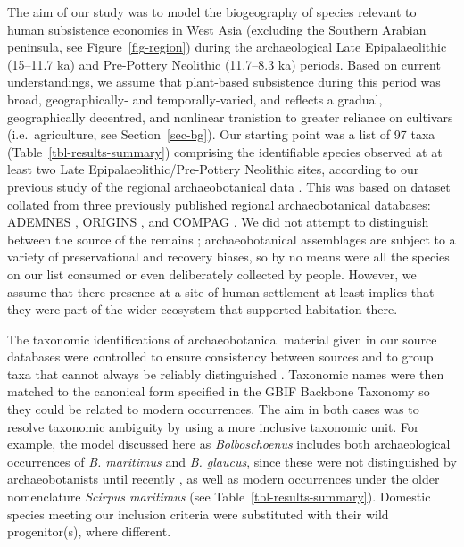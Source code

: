 \documentclass[
  authoryear,
  preprint]{elsarticle}
\begin{document}
The aim of our study was to model the biogeography of species relevant
to human subsistence economies in West Asia (excluding the Southern
Arabian peninsula, see Figure~\ref{fig-region}) during the
archaeological Late Epipalaeolithic (15--11.7 ka) and Pre-Pottery
Neolithic (11.7--8.3 ka) periods. Based on current understandings, we
assume that plant-based subsistence during this period was broad,
geographically- and temporally-varied, and reflects a gradual,
geographically decentred, and nonlinear tranistion to greater reliance
on cultivars (i.e.~agriculture, see Section~\ref{sec-bg}). Our starting
point was a list of 97 taxa (Table~\ref{tbl-results-summary}) comprising
the identifiable species observed at at least two Late
Epipalaeolithic/Pre-Pottery Neolithic sites, according to our previous
study of the regional archaeobotanical data
\citep{ArranzOtaeguiRoe2023}. This was based on dataset collated from
three previously published regional archaeobotanical databases: ADEMNES
\citep{ADEMNES}, ORIGINS \citep{ORIGINS}, and COMPAG
\citetext{\citealp{LucasFuller2018}; \citealp{FullerEtAl2018}; \citealp[based
on][]{ColledgeEtAl2004}; \citealp{ShennanConolly2007}}. We did not
attempt to distinguish between the source of the remains
\citep[cf.][]{WallaceEtAl2018}; archaeobotanical assemblages are subject
to a variety of preservational and recovery biases, so by no means were
all the species on our list consumed or even deliberately collected by
people. However, we assume that there presence at a site of human
settlement at least implies that they were part of the wider ecosystem
that supported habitation there.

The taxonomic identifications of archaeobotanical material given in our
source databases were controlled to ensure consistency between sources
and to group taxa that cannot always be reliably distinguished
\citep[for details see][]{ArranzOtaeguiRoe2023}. Taxonomic names were
then matched to the canonical form specified in the GBIF Backbone
Taxonomy \citep{GBIFSecretariat2023} so they could be related to modern
occurrences. The aim in both cases was to resolve taxonomic ambiguity by
using a more inclusive taxonomic unit. For example, the model discussed
here as \emph{Bolboschoenus} includes both archaeological occurrences of
\emph{B. maritimus} and \emph{B. glaucus}, since these were not
distinguished by archaeobotanists until recently
\citep{WollstonecroftEtAl2011}, as well as modern occurrences under the
older nomenclature \emph{Scirpus maritimus} (see
Table~\ref{tbl-results-summary}). Domestic species meeting our inclusion
criteria were substituted with their wild progenitor(s), where
different.
\end{document}
